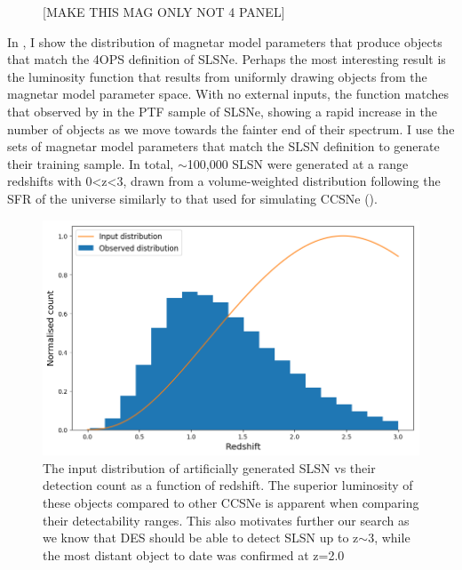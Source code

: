 \begin{table}
  \caption{}
  \label{tab:4OPS}

\end{table}

\begin{figure}
  \caption{[MAKE THIS MAG ONLY NOT 4 PANEL]}
  \label{fig:4OPSMag}
\end{figure}

In , I show the distribution of magnetar model parameters that produce objects that match the 4OPS definition of SLSNe. Perhaps the most interesting result is the luminosity function that results from uniformly drawing objects from the magnetar model parameter space. With no external inputs, the function matches that observed by \citet{DeCia2017} in the PTF sample of SLSNe, showing a rapid increase in the number of objects as we move towards the fainter end of their spectrum. I use the sets of magnetar model parameters that match the SLSN definition to generate their training sample. In total, $\sim$100,000 SLSN were generated at a range redshifts with 0<z<3, drawn from a volume-weighted distribution following the SFR of the universe \citep{Beacon2004} similarly to that used for simulating CCSNe ().

\begin{figure}
  \includegraphics[width=\textwidth]{Figures/Chapter5/SLSN_z_dist.png}
  \caption{The input distribution of artificially generated SLSN vs their detection count as a function of redshift. The superior luminosity of these objects compared to other CCSNe is apparent when comparing their detectability ranges. This also motivates further our search as we know that DES should be able to detect SLSN up to z$\sim$3, while the most distant object to date was confirmed at z=2.0}
  \label{fig:SLSNDist}
\end{figure}

